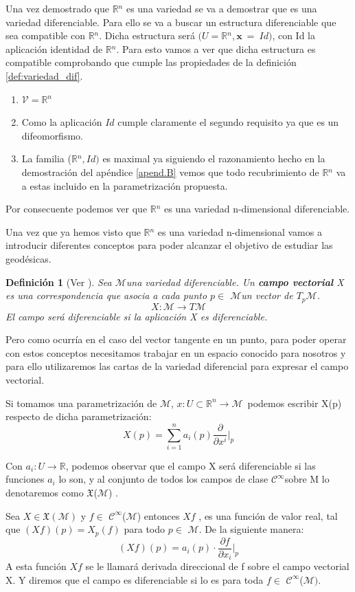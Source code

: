 \documentclass[pdftex,11pt,a4paper]{book}
\newtheorem{defi}{Definici\'on}
\newcommand{\M}{$\mathscr{M}$}
\newcommand{\Cinf}{ $\mathscr{C}^\infty$}
\newcommand{\tpm}{$T_p\mathscr{M}$}
\newcommand{\R}{$\mathbb{R}$}
\begin{document}
Una vez demostrado que \R$^n$ es una variedad se va a demostrar que es una variedad diferenciable. Para ello se va a buscar un estructura diferenciable que sea compatible con \R$^n$. Dicha estructura será $(U= $\R$^n, \textbf{x} \ =\ Id)$, con Id la aplicación identidad de \R$^n$. Para esto vamos a ver que dicha estructura es compatible comprobando que cumple las propiedades de la definición \ref{def:variedad_dif}. 
\label{varR}
\begin{enumerate}
\item $\mathscr{V} = $\R$^n$ 
\item Como la aplicación $Id$ cumple claramente el segundo requisito ya que es un difeomorfismo. 
\item La familia (\R$^n, Id)$ es maximal ya siguiendo el razonamiento hecho en la demostración del apéndice \ref{apend.B} vemos que todo recubrimiento de \R$^n$ va a estas incluido en la parametrización propuesta.
\end{enumerate}
Por consecuente podemos ver que \R$^n$ es una variedad n-dimensional diferenciable.\hfill\qedsymbol

Una vez que ya hemos visto que \R$^n$ es una variedad n-dimensional vamos a introducir diferentes conceptos para poder alcanzar el objetivo de estudiar las geodésicas. 
\begin{defi} [Ver \cite{boothby}]
 Sea \M una variedad diferenciable. Un \textbf{campo vectorial} X es una correspondencia que asocia a cada punto $p \in$ \M un vector de \tpm.
$$
X:\mathcal{M} \to T\mathcal{M}
$$
El campo será diferenciable si la aplicación X es diferenciable. 
\end{defi}

Pero como ocurría en el caso del vector tangente en un punto, para poder operar con estos conceptos necesitamos trabajar en un espacio conocido para nosotros y para ello utilizaremos las cartas de la variedad diferencial para expresar el campo vectorial.  

Si tomamos una parametrización de \M, $x:U\subset \mathbb{R}^n\to$\M \ podemos escribir X(p) respecto de dicha parametrización: 
$$X(p)=\sum_{i=1}^n a_i(p)\frac{\partial}{\partial x^i}\bigg|_p$$

Con $a_i:U\to \mathbb{R}$, podemos observar que el campo X será diferenciable si las funciones $a_i$ lo son, y al conjunto de todos los campos de clase \Cinf sobre M lo denotaremos como $\mathfrak{X}$(\M) .


Sea $X \in \mathfrak{X}(\mathscr{M})$ y $f \in $\Cinf(\M) entonces   $Xf $ , es una función de valor real, tal que  $(Xf)(p) = X_p(f)$ para todo $p \in$ \M.  De la siguiente manera: 
\begin{equation}
    (Xf)(p) = a_i(p)\cdot\frac{\partial f}{\partial x_i}\bigg|_p
\end{equation}
A esta función $Xf$ se le llamará derivada direccional de f sobre el campo vectorial X. Y diremos que el campo es diferenciable si lo es para toda $f \in $\Cinf($\mathscr{M})$.
\end{document}

